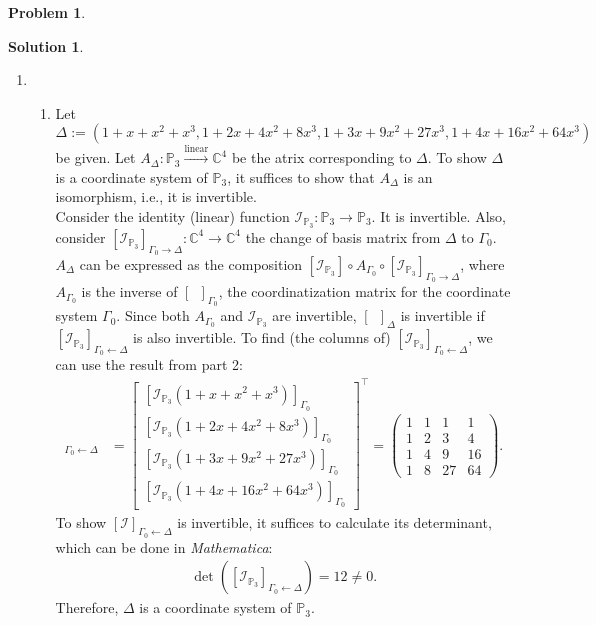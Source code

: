 \documentclass{article}
\theoremstyle{definition}
\newtheorem*{prob*}{Problem}
\newtheorem*{sln*}{Solution}
\newcommand{\lin}{\overset{\text{linear}}{\longrightarrow}}
\begin{document}
\begin{prob*}
\begin{enumerate}
	
	\end{enumerate}



	\begin{sln*}
		$\,$
		\begin{enumerate}
			\item 
			\begin{enumerate}
				\item Let $\Delta := (1 + x + x^2 + x^3, 1 + 2x+4x^2 + 8x^3, 1 + 3x+9x^2 + 27x^3, 1+ 4x +16x^2 + 64x^3) $ be given. Let $A_\Delta : \mathbb{P}_3 \lin \mathbb{C}^4$ be the atrix corresponding to $\Delta$. To show $\Delta$ is a coordinate system of $\mathbb{P}_3$, it suffices to show that $A_\Delta$ is an isomorphism, i.e., it is invertible.\\
				
				Consider the identity (linear) function $\mathcal{I}_{\mathbb{P}_3} : \mathbb{P}_3 \to \mathbb{P}_3$. It is invertible. Also, consider $[\mathcal{I}_{\mathbb{P}_3}]_{\Gamma_0\to\Delta}: \mathbb{C}^4\to \mathbb{C}^4$ the change of basis matrix from $\Delta$ to $\Gamma_0$. \\
				
				$A_\Delta $ can be expressed as the composition $[\mathcal{I}_{\mathbb{P}_3}] \circ A_{\Gamma_0} \circ [\mathcal{I}_{\mathbb{P}_3}]_{\Gamma_0\to \Delta}  $, where $A_{\Gamma_0}$ is the inverse of $[\,\,\,]_{\Gamma_0}$, the coordinatization matrix for the coordinate system $\Gamma_0$. Since both $A_{\Gamma_0}$ and $\mathcal{I}_{\mathbb{P}_3}$ are invertible, $[\,\,\,]_\Delta$ is invertible if $[\mathcal{I}_{\mathbb{P}_3}]_{\Gamma_0\leftarrow\Delta}$ is also invertible. To find (the columns of) $[\mathcal{I}_{\mathbb{P}_3}]_{\Gamma_0\leftarrow\Delta}$, we can use the result from part 2:
				\begin{align*}
				[\mathcal{I}]_{\Gamma_0\leftarrow\Delta}
				&= \begin{bmatrix}
				[\mathcal{I}_{\mathbb{P}_3}(1+x+x^2+x^3)]_{\Gamma_0}\\ [\mathcal{I}_{\mathbb{P}_3}(1+2x+4x^2+8x^3)]_{\Gamma_0} \\ [\mathcal{I}_{\mathbb{P}_3}(1+3x+9x^2+27x^3)]_{\Gamma_0} \\ [\mathcal{I}_{\mathbb{P}_3}(1+4x+16x^2+64x^3)]_{\Gamma_0}
				\end{bmatrix}^\top
				= \begin{pmatrix}
				1&1&1&1\\
				1&2&3&4\\
				1&4&9&16\\
				1&8&27&64
				\end{pmatrix}.
				\end{align*} 
				To show $[\mathcal{I}]_{\Gamma_0\leftarrow\Delta}$ is invertible, it suffices to calculate its determinant, which can be done in \textit{Mathematica}:
				\begin{align*}
				\det\left([\mathcal{I}_{\mathbb{P}_3}]_{\Gamma_0\leftarrow\Delta}\right) = 12 \neq 0.
				\end{align*}
				Therefore, $\Delta$ is a coordinate system of $\mathbb{P}_3$.\\
				

\end{enumerate}
\end{enumerate}
\end{sln*}
\end{prob*}
\end{document}
